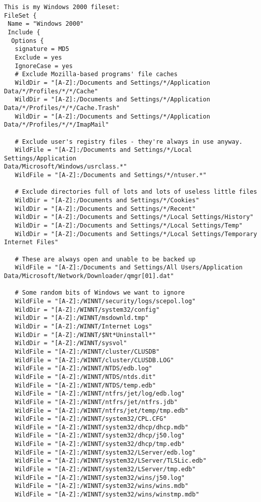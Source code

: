 \footnotesize
\begin{verbatim}
This is my Windows 2000 fileset:
FileSet {
 Name = "Windows 2000"
 Include {
  Options {
   signature = MD5
   Exclude = yes
   IgnoreCase = yes
   # Exclude Mozilla-based programs' file caches
   WildDir = "[A-Z]:/Documents and Settings/*/Application 
Data/*/Profiles/*/*/Cache"
   WildDir = "[A-Z]:/Documents and Settings/*/Application 
Data/*/Profiles/*/*/Cache.Trash"
   WildDir = "[A-Z]:/Documents and Settings/*/Application
Data/*/Profiles/*/*/ImapMail"

   # Exclude user's registry files - they're always in use anyway.
   WildFile = "[A-Z]:/Documents and Settings/*/Local Settings/Application
Data/Microsoft/Windows/usrclass.*"
   WildFile = "[A-Z]:/Documents and Settings/*/ntuser.*"

   # Exclude directories full of lots and lots of useless little files
   WildDir = "[A-Z]:/Documents and Settings/*/Cookies"
   WildDir = "[A-Z]:/Documents and Settings/*/Recent"
   WildDir = "[A-Z]:/Documents and Settings/*/Local Settings/History"
   WildDir = "[A-Z]:/Documents and Settings/*/Local Settings/Temp"
   WildDir = "[A-Z]:/Documents and Settings/*/Local Settings/Temporary
Internet Files"

   # These are always open and unable to be backed up
   WildFile = "[A-Z]:/Documents and Settings/All Users/Application
Data/Microsoft/Network/Downloader/qmgr[01].dat"

   # Some random bits of Windows we want to ignore
   WildFile = "[A-Z]:/WINNT/security/logs/scepol.log"
   WildDir = "[A-Z]:/WINNT/system32/config"
   WildDir = "[A-Z]:/WINNT/msdownld.tmp"
   WildDir = "[A-Z]:/WINNT/Internet Logs"
   WildDir = "[A-Z]:/WINNT/$Nt*Uninstall*"
   WildDir = "[A-Z]:/WINNT/sysvol"
   WildFile = "[A-Z]:/WINNT/cluster/CLUSDB"
   WildFile = "[A-Z]:/WINNT/cluster/CLUSDB.LOG"
   WildFile = "[A-Z]:/WINNT/NTDS/edb.log"
   WildFile = "[A-Z]:/WINNT/NTDS/ntds.dit"
   WildFile = "[A-Z]:/WINNT/NTDS/temp.edb"
   WildFile = "[A-Z]:/WINNT/ntfrs/jet/log/edb.log"
   WildFile = "[A-Z]:/WINNT/ntfrs/jet/ntfrs.jdb"
   WildFile = "[A-Z]:/WINNT/ntfrs/jet/temp/tmp.edb"
   WildFile = "[A-Z]:/WINNT/system32/CPL.CFG"
   WildFile = "[A-Z]:/WINNT/system32/dhcp/dhcp.mdb"
   WildFile = "[A-Z]:/WINNT/system32/dhcp/j50.log"
   WildFile = "[A-Z]:/WINNT/system32/dhcp/tmp.edb"
   WildFile = "[A-Z]:/WINNT/system32/LServer/edb.log"
   WildFile = "[A-Z]:/WINNT/system32/LServer/TLSLic.edb"
   WildFile = "[A-Z]:/WINNT/system32/LServer/tmp.edb"
   WildFile = "[A-Z]:/WINNT/system32/wins/j50.log"
   WildFile = "[A-Z]:/WINNT/system32/wins/wins.mdb"
   WildFile = "[A-Z]:/WINNT/system32/wins/winstmp.mdb"


\end{verbatim}
